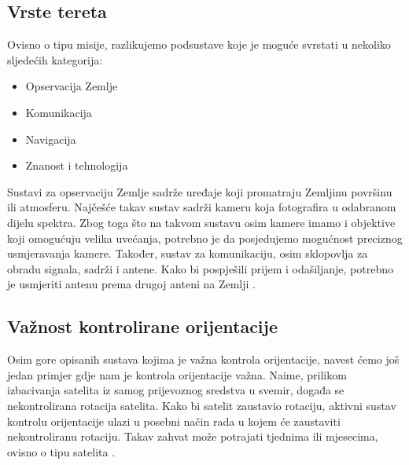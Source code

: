 \documentclass[times, utf8, diplomski, numeric]{templates/template}
\begin{document}
{{        \subsection{Vrste tereta}{
            Ovisno o tipu misije, razlikujemo podsustave koje je moguće svrstati u nekoliko sljedećih kategorija:

            \begin{itemize}
                \item Opservacija Zemlje
                \item Komunikacija
                \item Navigacija
                \item Znanost i tehnologija
            \end{itemize}

            Sustavi za opservaciju Zemlje sadrže uređaje koji promatraju Zemljinu površinu ili atmosferu. Najčešće takav sustav sadrži kameru koja fotografira u odabranom dijelu spektra. Zbog toga što na takvom sustavu osim kamere imamo i objektive koji omogućuju velika uvećanja, potrebno je da posjedujemo mogućnost preciznog usmjeravanja kamere. Također, sustav za komunikaciju, osim sklopovlja za obradu signala, sadrži i antene. Kako bi pospješili prijem i odašiljanje, potrebno je usmjeriti antenu prema drugoj anteni na Zemlji \cite{sattelitePayload}.

            \subsection{Važnost kontrolirane orijentacije}{
                Osim gore opisanih sustava kojima je važna kontrola orijentacije, navest ćemo još jedan primjer gdje nam je kontrola orijentacije važna. Naime, prilikom izbacivanja satelita iz samog prijevoznog sredstva u svemir, događa se nekontrolirana rotacija satelita. Kako bi satelit zaustavio rotaciju, aktivni sustav kontrolu orijentacije ulazi u posebni način rada  u kojem će zaustaviti nekontroliranu rotaciju. Takav zahvat može potrajati tjednima ili mjesecima, ovisno o tipu satelita \cite{fersat}.
            }
        }
    }
}
\end{document}

